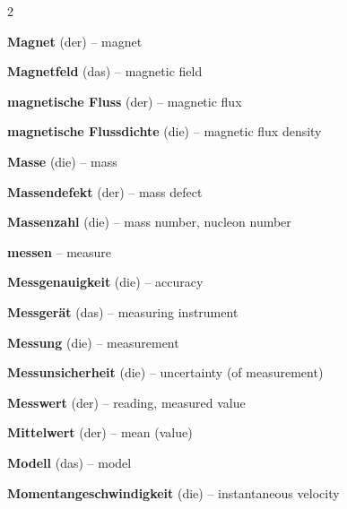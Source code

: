 \begin{multicols}{2}
\par\nopagebreak
\textbf{Magnet} (der) -- magnet\dotfill\hyperref[e:174]{\pageref*{e:174}}\par
\textbf{Magnetfeld} (das) -- magnetic field\dotfill\hyperref[e:178]{\pageref*{e:178}}\par
\textbf{magnetische Fluss} (der) -- magnetic flux\dotfill\hyperref[e:180]{\pageref*{e:180}}\par
\textbf{magnetische Flussdichte} (die) -- magnetic flux density\dotfill\hyperref[e:179]{\pageref*{e:179}}\par
\textbf{Masse} (die) -- mass\dotfill\hyperref[e:56]{\pageref*{e:56}}\par
\textbf{Massendefekt} (der) -- mass defect\dotfill\hyperref[e:289]{\pageref*{e:289}}\par
\textbf{Massenzahl} (die) -- mass number, nucleon number\dotfill\hyperref[e:268]{\pageref*{e:268}}\par
\textbf{messen} -- measure\dotfill\hyperref[e:8]{\pageref*{e:8}}\par
\textbf{Messgenauigkeit} (die) -- accuracy\dotfill\hyperref[e:13]{\pageref*{e:13}}\par
\textbf{Messgerät} (das) -- measuring instrument\dotfill\hyperref[e:11]{\pageref*{e:11}}\par
\textbf{Messung} (die) -- measurement\dotfill\hyperref[e:9]{\pageref*{e:9}}\par
\textbf{Messunsicherheit} (die) -- uncertainty (of measurement)\dotfill\hyperref[e:14]{\pageref*{e:14}}\par
\textbf{Messwert} (der) -- reading, measured value\dotfill\hyperref[e:10]{\pageref*{e:10}}\par
\textbf{Mittelwert} (der) -- mean (value)\dotfill\hyperref[e:15]{\pageref*{e:15}}\par
\textbf{Modell} (das) -- model\dotfill\hyperref[e:22]{\pageref*{e:22}}\par
\textbf{Momentangeschwindigkeit} (die) -- instantaneous velocity\dotfill\hyperref[e:39]{\pageref*{e:39}}\par


\end{multicols}
